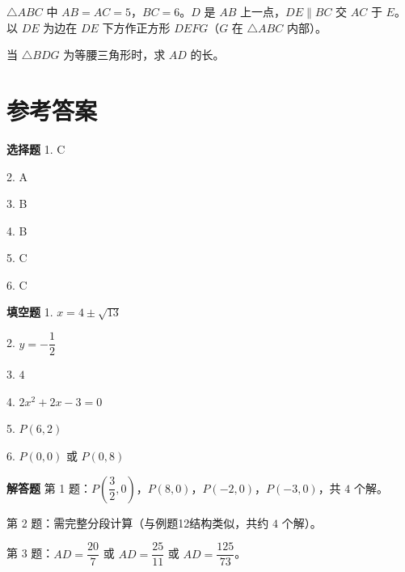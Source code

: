 \documentclass{exam-zh}
\newcommand{\answerarea}[1][40mm]{%
  \vspace{2mm}%
  \begin{tcolorbox}[
    enhanced, breakable,
    colback=white,
    colframe=white,
    boxrule=0pt,
    height=#1,
    valign=top,
    bottom=0mm,
    after skip=0mm,
  ]
  \end{tcolorbox}%
}
\begin{document}

\begin{problem}[points=10]
  $\triangle ABC$ 中 $AB=AC=5$，$BC=6$。$D$ 是 $AB$ 上一点，$DE \parallel BC$ 交 $AC$ 于 $E$。以 $DE$ 为边在 $DE$ 下方作正方形 $DEFG$（$G$ 在 $\triangle ABC$ 内部）。

当 $\triangle BDG$ 为等腰三角形时，求 $AD$ 的长。
  \answerarea[80mm]
\end{problem}


\clearpage
\section*{参考答案}


\begin{keyideabox}
  \textbf{选择题}
  1. C

2. A

3. B

4. B

5. C

6. C
\end{keyideabox}



\begin{keyideabox}
  \textbf{填空题}
  1. $x=4\pm\sqrt{13}$

2. $y=-\dfrac{1}{2}$

3. $4$

4. $2x^2+2x-3=0$

5. $P(6,2)$

6. $P(0,0)$ 或 $P(0,8)$
\end{keyideabox}



\begin{keyideabox}
  \textbf{解答题}
  第 1 题：$P\left(\dfrac{3}{2},0\right)$，$P(8,0)$，$P(-2,0)$，$P(-3,0)$，共 $4$ 个解。

第 2 题：需完整分段计算（与例题12结构类似，共约 $4$ 个解）。

第 3 题：$AD = \dfrac{20}{7}$ 或 $AD = \dfrac{25}{11}$ 或 $AD = \dfrac{125}{73}$。
\end{keyideabox}
\end{document}

